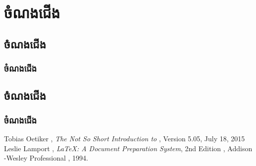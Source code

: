 \documentclass[12pt, 4appaer]{book}
\begin{document}
	\frontmatter
	\tableofcontents
	\mainmatter
	\part{ចំណងជើង}
	\chapter{ចំណងជើង}
	\section{ចំណងជើង}
	\chapter{ចំណងជើង}
	\section{ចំណងជើង}
	\appendix
	\backmatter
	\begin{thebibliography}{2}
		 Tobias Oetiker , \emph{The Not So Short Introduction to
			\LaTeXe}, Version 5.05, July 18, 2015
		 Leslie Lamport , \emph{\LaTeX: A Document Preparation
			System}, 2nd Edition , Addison -Wesley Professional , 1994.
	\end{thebibliography}
\end{document}
